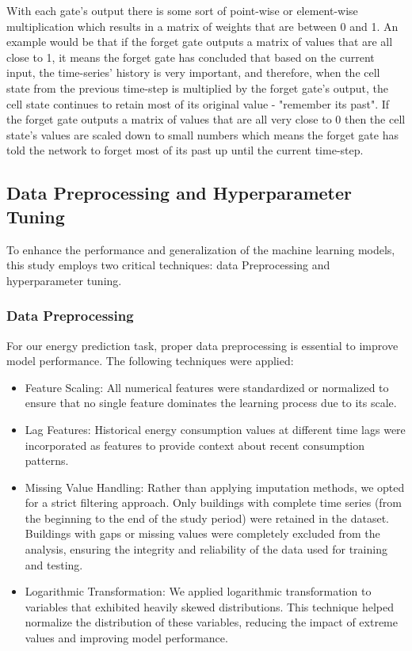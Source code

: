 With each gate's output there is some sort of point-wise or element-wise multiplication which results in a matrix of weights that are between 0 and 1. An example would be that if the forget gate outputs a matrix of values that are all close to 1, it means the forget gate has concluded that based on the current input, the time-series' history is very important, and therefore, when the cell state from the previous time-step is multiplied by the forget gate's output, the cell state continues to retain most of its original value - "remember its past". If the forget gate outputs a matrix of values that are all very close to 0 then the cell state's values are scaled down to small numbers which means the forget gate has told the network to forget most of its past up until the current time-step\cite{medium_lstm}.

\subsection{Data Preprocessing and Hyperparameter Tuning}

To enhance the performance and generalization of the machine learning models, this study employs two critical techniques: data Preprocessing and hyperparameter tuning.

\subsubsection{Data Preprocessing}

For our energy prediction task, proper data preprocessing is essential to improve model performance. The following techniques were applied:

\begin{itemize}
    \item Feature Scaling: All numerical features were standardized or normalized to ensure that no single feature dominates the learning process due to its scale.
    \item Lag Features: Historical energy consumption values at different time lags were incorporated as features to provide context about recent consumption patterns.
    \item Missing Value Handling: Rather than applying imputation methods, we opted for a strict filtering approach. Only buildings with complete time series (from the beginning to the end of the study period) were retained in the dataset. Buildings with gaps or missing values were completely excluded from the analysis, ensuring the integrity and reliability of the data used for training and testing.
    \item Logarithmic Transformation: We applied logarithmic transformation to variables that exhibited heavily skewed distributions. This technique helped normalize the distribution of these variables, reducing the impact of extreme values and improving model performance.
\end{itemize}


